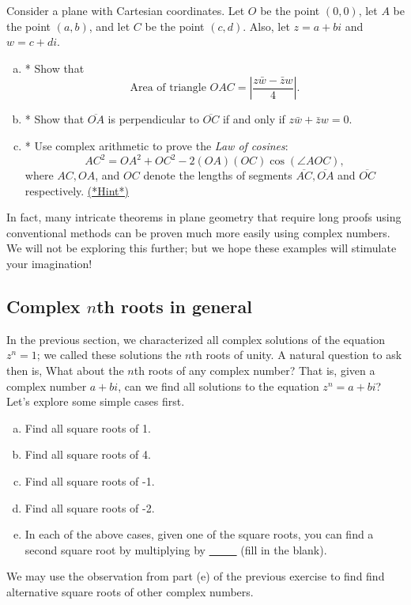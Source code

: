 \begin{exercise}{57}
Consider a plane with Cartesian coordinates. Let $O$ be the point $(0,0)$, let $A$ be the point $(a,b)$, and let $C$ be the point $(c,d)$. Also, let $z = a+bi$ and $w = c+di$.
\begin{enumerate}[(a)]
\item
*  Show that 
\[
\text{Area of triangle }OAC = \left| \frac{z \bar{w} - \bar{z} w}{4} \right|. \]
\item
* Show that $\overline{OA}$ is perpendicular to $\overline{OC}$ if and only if $z \bar{w} + \bar{z} w = 0$.
\item
* Use complex arithmetic to prove the \emph{Law of cosines}:
\[ AC^2 = OA^2 + OC^2 - 2(OA)(OC)\cos(\angle AOC),\]
where $AC,OA$, and $OC$ denote the lengths of segments $\overline{AC}, \overline{OA}$ and $\overline{OC}$ respectively. 
\hyperref[sec:complex:hints]{(*Hint*)}

\end{enumerate}
\end{exercise}

In fact, many intricate theorems in plane geometry that require long proofs using conventional methods can be proven much more easily using complex numbers. We will not be exploring this further; but we hope these examples will stimulate your imagination!


\subsection{Complex $n$th roots in general 
\quad{}}\label{rootsingeneral}

In the previous section, we characterized all complex solutions of the equation $z^n = 1$; we called these solutions the $n$th roots of unity. A natural question to ask then is, What about the $n$th roots of any complex number? That is, given a complex number $a + bi$, can we find all solutions to the equation $z^n = a + bi$? Let's explore some simple cases first.

\begin{exercise}{58}
\begin{enumerate}[(a)]
\item
Find all square roots of 1. 
\item
Find all square roots of 4.
\item
Find all square roots of -1.
\item
Find all square roots of -2.
\item
In each of the above cases, given one of the square roots, you can find a second square root by multiplying by \underline{~~~~~} (fill in the blank).
\end{enumerate}
\end{exercise}
We may use the observation from part (e) of the previous exercise to find find alternative square roots of other complex numbers.

